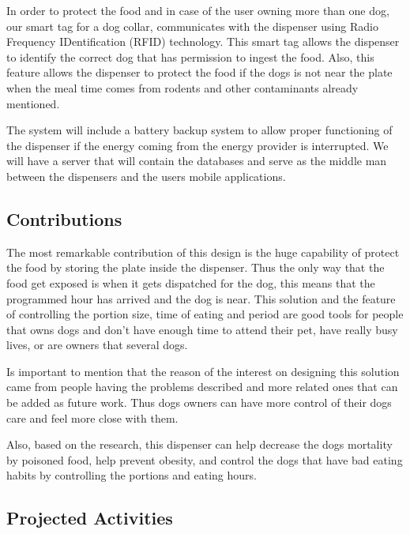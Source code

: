 \documentclass[12pt]{article}
\begin{document}
In order to protect the food and in case of the user owning more than one dog, our smart tag for a dog collar, communicates with the dispenser using Radio Frequency IDentification (RFID) technology. This smart tag allows the dispenser to identify the correct dog that has permission to ingest the food. Also, this feature allows the dispenser to protect the food if the dogs is not near the plate when the meal time comes from rodents and other contaminants already mentioned.

The system will include a battery backup system to allow  proper functioning of the dispenser if the energy coming from the energy provider is interrupted. We will have a server that will contain the databases and serve as the middle man between the dispensers and the users mobile applications.

\subsection{Contributions}

The most remarkable contribution of this design is the huge capability of protect the food by storing the plate inside the dispenser. Thus the only way that the food get exposed is when it gets dispatched for the dog, this means that the programmed hour has arrived and the dog is near. This solution and the feature of controlling the portion size, time of eating and period are good tools for people that owns dogs and don't have enough time to attend their pet, have really busy lives, or are owners that several dogs.

Is important to mention that the reason of the interest on designing this solution came from people having the problems described and more related ones that can be added as future work. Thus dogs owners can have more control of their dogs care and feel more close with them.

Also, based on the research, this dispenser can help decrease the dogs mortality by poisoned food, help prevent obesity, and control the dogs that have bad eating habits by controlling the portions and eating hours.
\newpage

\subsection{Projected Activities}
\end{document}
